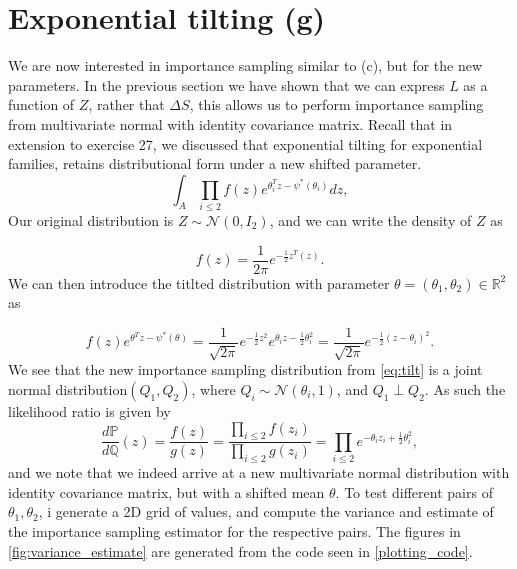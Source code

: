 \documentclass{article}
\begin{document}
\section{Exponential tilting (g)}
We are now interested in importance sampling similar to (c), but for the new parameters. In the previous section we have shown that we can express $L$ as a function of $Z$, rather that $\Delta S$, this allows us to perform importance sampling from multivariate normal with identity covariance matrix. Recall that in extension to exercise 27, we discussed that exponential tilting for exponential families, retains distributional form under a new shifted parameter.
\begin{equation}
    \int_A \prod_{i\leq 2} f(z) e^{\theta_i^Tz - \psi^*(\theta_i)} dz, \label{eq:tilt}
\end{equation}
Our original distribution is $Z \sim \mathcal{N}(0, I_2)$, and we can write the density of $Z$ as

\begin{equation*}
    f(z) = \dfrac{1}{2\pi}e^{-\frac{1}{2}z^T(z)}.
\end{equation*}
We can then introduce the titlted distribution with parameter $\theta = (\theta_1, \theta_2)\in \mathbb{R}^2$ as


\begin{equation*}
    f(z) e^{\theta^Tz - \psi^*(\theta)} = \dfrac{1}{\sqrt{2\pi}} e^{-\frac{1}{2}z^2} e^{\theta_i z - \frac{1}{2}\theta_i^2} = \dfrac{1}{\sqrt{2\pi}} e^{-\frac{1}{2}(z - \theta_i)^2}.
\end{equation*}
We see that the new importance sampling distribution from \eqref{eq:tilt} is a joint normal distribution$ (Q_1, Q_2)$, where $ Q_i \sim \mathcal{N}(\theta_i, 1)$, and $Q_1 \perp Q_2$. As such the likelihood ratio is given by
\begin{equation}
   \dfrac{d\mathbb{P}}{d \mathbb{Q}}(z) =  \dfrac{f(z)}{g(z)} = \dfrac{\prod_{i\leq 2} f(z_i)}{\prod_{i\leq 2} g(z_i)} = \prod_{i\leq 2} e^{-\theta_i z_i + \frac{1}{2}\theta_i^2},
\end{equation}
and we note that we indeed arrive at a new multivariate normal distribution with identity covariance matrix, but with a shifted mean $\theta$. To test different pairs of $\theta_1, \theta_2$, i generate a 2D grid of values, and compute the variance and estimate of the importance sampling estimator for the respective pairs. The figures in \autoref{fig:variance_estimate} are generated from the code seen in \autoref{plotting_code}.
\end{document}
